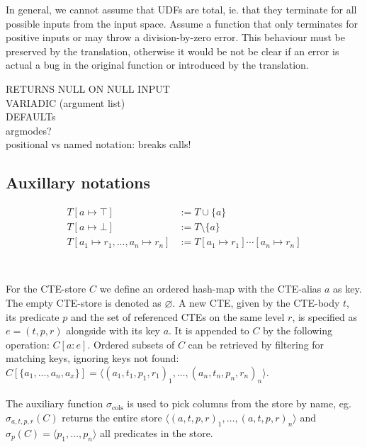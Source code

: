 In general, we cannot assume that UDFs are total, ie. that they terminate for all possible inputs from the input space. Assume a function that only terminates for positive inputs or may throw a division-by-zero error. This behaviour must be preserved by the translation, otherwise it would be not be clear if an error is actual a bug in the original function or introduced by the translation.

RETURNS NULL ON NULL INPUT\\
VARIADIC (argument list)\\
DEFAULTs\\
argmodes?\\
positional vs named notation: breaks calls!


\subsection{Auxillary notations}
\begin{align*}
    T[a \mapsto \top] &:= T \cup \{a\}\\
    T[a \mapsto \bot] &:= T \setminus \{a\}\\
    T[a_1 \mapsto r_1, ..., a_n \mapsto r_n] &:= T[a_1 \mapsto r_1] \cdots[a_n \mapsto r_n]\\
\end{align*}
\\\\
For the CTE-store $C$ we define an ordered hash-map with the CTE-alias $a$ as key. The empty CTE-store is denoted as $\varnothing$. A new CTE, given by the CTE-body $t$, its predicate $p$ and the set of referenced CTEs on the same level $r$, is specified as $e=(t, p, r)$ alongside with its key $a$. It is appended to $C$ by the following operation: $C[a: e]$. Ordered subsets of $C$ can be retrieved by filtering for matching keys, ignoring keys not found: $C[\{a_1, ..., a_n, a_x\}] = \langle (a_1, t_1, p_1, r_1)_1, \dots, (a_n, t_n, p_n, r_n)_n\rangle$.
\\\\
The auxiliary function $\sigma_{\text{cols}}$ is used to pick columns from the store by name, eg. $\sigma_{a, t, p, r}(C)$ returns the entire store $\langle (a, t, p, r)_1, \dots, (a, t, p, r)_n \rangle$ and $\sigma_p(C) = \langle p_1, \dots, p_n \rangle$ all predicates in the store.
\\\\







